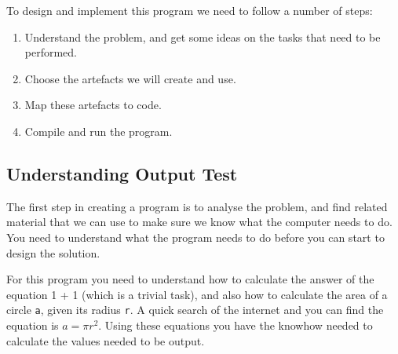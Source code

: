 To design and implement this program we need to follow a number of steps:

\begin{enumerate}
  \item Understand the problem, and get some ideas on the tasks that need to be performed.
  \item Choose the artefacts we will create and use.
  \item Map these artefacts to code.
  \item Compile and run the program.
\end{enumerate}




\clearpage
\subsection{Understanding Output Test} %
\label{sub:understanding_output_test}

The first step in creating a program is to analyse the problem, and find related material that we can use to make sure we know what the computer needs to do. You need to understand what the program needs to do before you can start to design the solution.

For this program you need to understand how to calculate the answer of the equation 1 + 1 (which is a trivial task), and also how to calculate the area of a circle \texttt{a}, given its radius \texttt{r}. A quick search of the internet and you can find the equation is $a=\pi r^2$. Using these equations you have the knowhow needed to calculate the values needed to be output.

